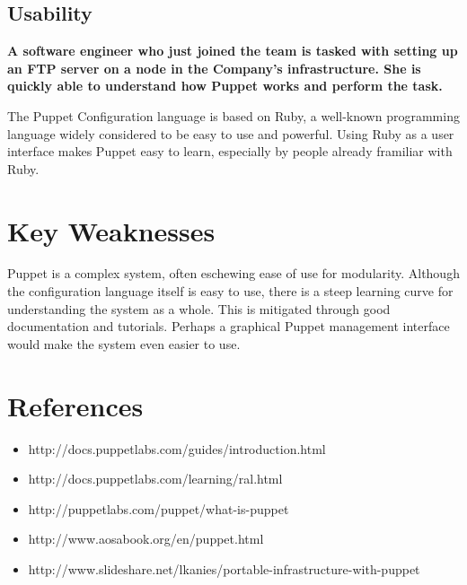 \documentclass[a4paper]{article}
\begin{document}
\subsection{Usability}

\textbf{A software engineer who just joined the team is tasked with setting up an FTP server on a node in the Company's infrastructure. She is quickly able to understand how Puppet works and perform the task.}

The Puppet Configuration language is based on Ruby, a well-known programming language widely considered to be  easy to use and powerful. Using Ruby as a user interface makes Puppet easy to learn, especially by people already framiliar with Ruby.

\section{Key Weaknesses} %


Puppet is a complex system, often eschewing ease of use for modularity. Although the configuration language itself is easy to use, there is a steep learning curve for understanding the system as a whole. This is mitigated through good documentation and tutorials. Perhaps a graphical Puppet management interface would make the system even easier to use.

\section{References} %


\begin{itemize}
\item http://docs.puppetlabs.com/guides/introduction.html
\item http://docs.puppetlabs.com/learning/ral.html
\item http://puppetlabs.com/puppet/what-is-puppet
\item http://www.aosabook.org/en/puppet.html
\item http://www.slideshare.net/lkanies/portable-infrastructure-with-puppet
\end{itemize}
\end{document}
